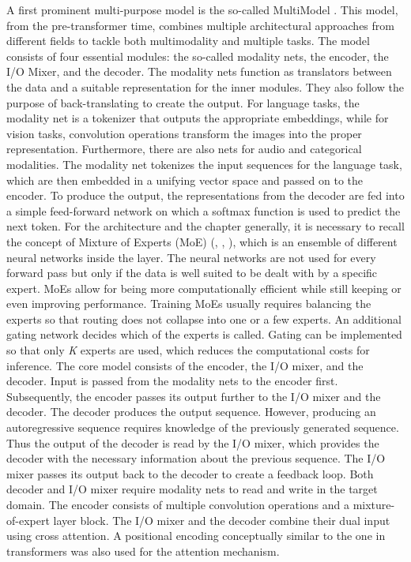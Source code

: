 \documentclass[
]{krantz}
\begin{document}
A first prominent multi-purpose model is the so-called MultiModel \citep{Kaiser2017}. This model, from the pre-transformer time, combines multiple architectural approaches from different fields to tackle both multimodality and multiple tasks.
The model consists of four essential modules: the so-called modality nets, the encoder, the I/O Mixer, and the decoder. The modality nets function as translators between the data and a suitable representation for the inner modules. They also follow the purpose of back-translating to create the output. For language tasks, the modality net is a tokenizer that outputs the appropriate embeddings, while for vision tasks, convolution operations transform the images into the proper representation. Furthermore, there are also nets for audio and categorical modalities.
The modality net tokenizes the input sequences for the language task, which are then embedded in a unifying vector space and passed on to the encoder. To produce the output, the representations from the decoder are fed into a simple feed-forward network on which a softmax function is used to predict the next token.
For the architecture and the chapter generally, it is necessary to recall the concept of Mixture of Experts (MoE) (\citet{Jacobs1991}, \citet{Jordan1994}, \citet{Shaazer2017}), which is an ensemble of different neural networks inside the layer. The neural networks are not used for every forward pass but only if the data is well suited to be dealt with by a specific expert. MoEs allow for being more computationally efficient while still keeping or even improving performance. Training MoEs usually requires balancing the experts so that routing does not collapse into one or a few experts. An additional gating network decides which of the experts is called. Gating can be implemented so that only \emph{K} experts are used, which reduces the computational costs for inference.
The core model consists of the encoder, the I/O mixer, and the decoder. Input is passed from the modality nets to the encoder first. Subsequently, the encoder passes its output further to the I/O mixer and the decoder. The decoder produces the output sequence. However, producing an autoregressive sequence requires knowledge of the previously generated sequence. Thus the output of the decoder is read by the I/O mixer, which provides the decoder with the necessary information about the previous sequence. The I/O mixer passes its output back to the decoder to create a feedback loop. Both decoder and I/O mixer require modality nets to read and write in the target domain.
The encoder consists of multiple convolution operations and a mixture-of-expert layer block. The I/O mixer and the decoder combine their dual input using cross attention. A positional encoding conceptually similar to the one in transformers was also used for the attention mechanism.
\end{document}
